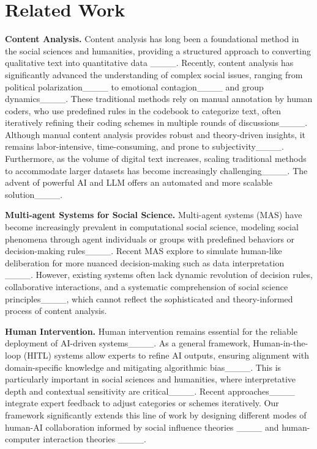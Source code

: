 \section{Related Work}
\textbf{Content Analysis.} Content analysis has long been a foundational method in the social sciences and humanities, providing a structured approach to converting qualitative text into quantitative data ____. Recently, content analysis has significantly advanced the understanding of complex social issues, ranging from political polarization____ to emotional contagion____ and group dynamics____. These traditional methods rely on manual annotation by human coders, who use predefined rules in the codebook to categorize text, often iteratively refining their coding schemes in multiple rounds of discussions____. Although manual content analysis provides robust and theory-driven insights, it remains labor-intensive, time-consuming, and prone to subjectivity____. Furthermore, as the volume of digital text increases, scaling traditional methods to accommodate larger datasets has become increasingly challenging____. The advent of powerful AI and LLM offers an automated and more scalable solution____.

\noindent\textbf{Multi-agent Systems for Social Science.} Multi-agent systems (MAS) have become increasingly prevalent in computational social science, modeling social phenomena through agent individuals or groups with predefined behaviors or decision-making rules____. Recent MAS explore to simulate human-like deliberation for more nuanced decision-making such as data interpretation ____. However, existing systems often lack dynamic revolution of decision rules, collaborative interactions, and a systematic comprehension of social science principles____, which cannot reflect the sophisticated and theory-informed process of content analysis.

\noindent\textbf{Human Intervention.} Human intervention remains essential for the reliable deployment of AI-driven systems____. As a general framework, Human-in-the-loop (HITL) systems allow experts to refine AI outputs, ensuring alignment with domain-specific knowledge and mitigating algorithmic bias____. This is particularly important in social sciences and humanities, where interpretative depth and contextual sensitivity are critical____. Recent approaches____ integrate expert feedback to adjust categories or schemes iteratively. Our framework significantly extends this line of work by designing different modes of human-AI collaboration informed by social influence theories ____ and human-computer interaction theories ____.

